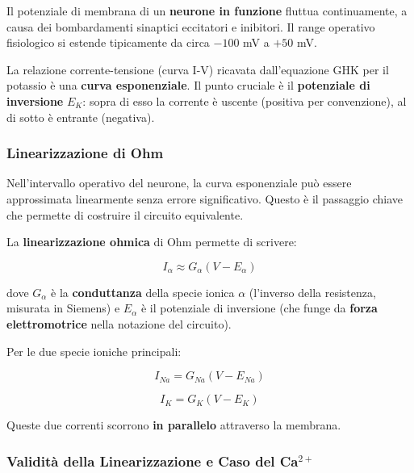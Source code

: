 Il potenziale di membrana di un \textbf{neurone in funzione} fluttua continuamente, a causa dei bombardamenti sinaptici eccitatori e inibitori. Il range operativo fisiologico si estende tipicamente da circa $-100$ mV a $+50$ mV.

La relazione corrente-tensione (curva I-V) ricavata dall'equazione GHK per il potassio è una \textbf{curva esponenziale}. Il punto cruciale è il \textbf{potenziale di inversione} $E_K$: sopra di esso la corrente è uscente (positiva per convenzione), al di sotto è entrante (negativa).

\subsubsection{Linearizzazione di Ohm}

\begin{tcolorbox}[colback=gray!5, colframe=gray!40, arc=2mm, boxrule=0.5pt]
Nell'intervallo operativo del neurone, la curva esponenziale può essere approssimata linearmente senza errore significativo. Questo è il passaggio chiave che permette di costruire il circuito equivalente.
\end{tcolorbox}

La \textbf{linearizzazione ohmica} di Ohm permette di scrivere:

\begin{equation}
I_\alpha \approx G_\alpha (V - E_\alpha)
\end{equation}

dove $G_\alpha$ è la \textbf{conduttanza} della specie ionica $\alpha$ (l'inverso della resistenza, misurata in Siemens) e $E_\alpha$ è il potenziale di inversione (che funge da \textbf{forza elettromotrice} nella notazione del circuito).

Per le due specie ioniche principali:

\begin{equation}
I_{Na} = G_{Na}(V - E_{Na})
\end{equation}

\begin{equation}
I_K = G_K(V - E_K)
\end{equation}

Queste due correnti scorrono \textbf{in parallelo} attraverso la membrana.

\subsubsection{Validità della Linearizzazione e Caso del Ca$^{2+}$}


